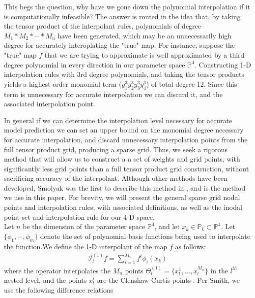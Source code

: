\documentclass{article}
\begin{document}
This begs the question, why have we gone down the polynomial interpolation if it is computationally infeasible? The answer is routed in the idea that, by taking the tensor product of the interpolant rules, polynomials of degree $M_1*M_2*\cdots *M_n$ have been generated, which may be an unnecessarily high degree for accurately interoplating the "true" map. For instance, suppose the "true" map $f$ that we are trying to approximate is well approximated by a third degree polynomial in every direction in our parameter space $\mathbb{P}^4$. Constructing 1-D interpolation rules with 3rd degree polynomials, and taking the tensor products yields a highest order monomial term ($y_1^3y_2^3y_3^3y_4^3$)  of total degree  12. Since this term is unnecessary for accurate interpolation we can discard it, and the associated interpolation point.\\

\vspace{0.01cm}

In general if we can determine the interpolation level necessary for accurate model prediction we can set an upper bound on the monomial degree necessary for accurate interpolation, and discard unnecessary interpolation points from the full tensor product grid, producing a sparse grid. Thus, we seek a rigorous method that will allow us to construct a a set of weights and grid points, with significantly less grid points than a full tensor product grid construction, without sacrificing accuracy of the interpolant. Although other methods have been developed, Smolyak was the first to describe this method in \cite{Smolyak},  and is the method we use in this paper. For brevity, we will present the general sparse grid nodal points and interpolation rules, with associated definitions, as well as the inodal point set and interpolation rule for our 4-D space.\\

\vspace{0.01cm}
Let $n$ be the dimension of the parameter space $\mathbb{P}^4$, and let  $x_k \in \mathbb{P}_k \subset \mathbb{P}^4$. Let $\{\phi_1,\cdots, \phi_m\}$ denote the set of polynomial basis functions being used to interpolate the function.We define the 1-D interpolant of the map $f$ as follows:
\begin{align*}
\mathcal{I}_l^{(1)}f = \sum_{i=1}^{M_n} f^i\phi_i(x_k)
\end{align*}
where the operator interpolates the $M_n$ points $\Theta_l^{(1)} = \{x_l^1, ..., x_l^{M_n} \}$ in the $l^{th}$ nested level, and the points $x_l^i$ are the Clenshaw-Curtis points \cite{R_Smith}. Per Smith, \cite{R_Smith} we use the following difference relations
\end{document}
